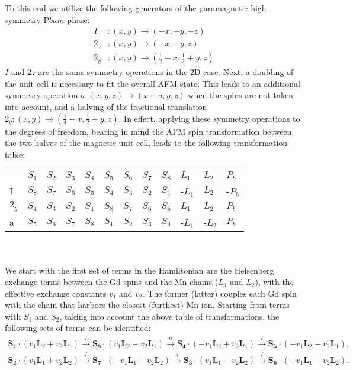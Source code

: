 To this end we utilize the following generators of the paramagnetic high symmetry P$bam$ phase:
\begin{align}
	I &: (x, y) \rightarrow (-x, -y, -z)\\
	2_z &: (x, y) \rightarrow (-x, -y, z)\\
	2_y &: (x, y) \rightarrow (\frac{1}{2} - x, \frac{1}{2} + y, z)
\end{align}
$I$ and $2z$ are the same symmetry operations in the 2D case. Next, a doubling of the unit cell is necessary to fit the overall AFM state. This leads to an additional symmetry operation $a: (x, y, z) \rightarrow (x + a, y, z)$ when the spins are not taken into account, and a halving of the fractional translation $2_y: (x, y) \rightarrow (\frac{1}{4} - x, \frac{1}{2}+y, z)$.
In effect, applying these symmetry operations to the degrees of freedom, bearing in mind the AFM spin transformation between the two halves of the magnetic unit cell, leads to the following transformation table:
\begin{table}[h]
\centering
\begin{tabular}{|l|lllllllllll|}
\cline{1-12}
 & $S_1$ & $S_2$ & $S_3$ & $S_4$ & $S_5$ & $S_6$ & $S_7$ & $S_8$ & $L_1$ & $L_2$ & $P_b$ \\ \cline{1-12}
I & $S_8$ & $S_7$ & $S_6$ & $S_5$ & $S_4$ & $S_3$ & $S_2$ & $S_1$ & -$L_1$ & $L_2$ & -$P_b$ \\ \cline{1-12}
$2_y$ & $S_4$ & $S_3$ & $S_2$ & $S_1$ & $S_8$ & $S_7$ & $S_6$ & $S_5$ & $L_1$ & $L_2$ & $P_b$ \\ \cline{1-12}
a & $S_5$ & $S_6$ & $S_7$ & $S_8$ & $S_1$ & $S_2$ & $S_3$ & $S_4$ & -$L_1$ & -$L_2$ & $P_b$ \\ \cline{1-12}
\end{tabular}
\end{table}\\\\
We start with the first set of terms in the Hamiltonian are the Heisenberg exchange terms between the Gd spins and the Mn chains ($L_1$ and $L_2$), with the effective exchange constants $v_1$ and $v_2$.
The former (latter) couples each Gd spin with the chain that harbors the closest (furthest) Mn ion.
Starting from terms with $S_1$ and $S_2$, taking into account the above table of transformations, the following sets of terms can be identified:
\begin{align}
	\mathbf{S}_1\cdot(v_1 \mathbf{L}_2 + v_2 \mathbf{L}_1) \xrightarrow{I} \mathbf{S_8}\cdot(v_1 \mathbf{L}_2 - v_2 \mathbf{L}_1) \xrightarrow{a} \mathbf{S_4} \cdot (- v_1 \mathbf{L}_2 + v_2 \mathbf{L}_1) \xrightarrow{I} \mathbf{S_5} \cdot (-v_1 \mathbf{L}_2 - v_2 \mathbf{L}_1), \nonumber\\
	\mathbf{S}_2\cdot(v_1 \mathbf{L}_1 + v_2 \mathbf{L}_2) \xrightarrow{I} \mathbf{S_7}\cdot(-v_1 \mathbf{L}_1 + v_2 \mathbf{L}_2) \xrightarrow{a} \mathbf{S_3} \cdot (v_1 \mathbf{L}_1 - v_2 \mathbf{L}_2) \xrightarrow{I} \mathbf{S_6} \cdot (-v_1 \mathbf{L}_1 - v_2 \mathbf{L}_2).
\end{align}
